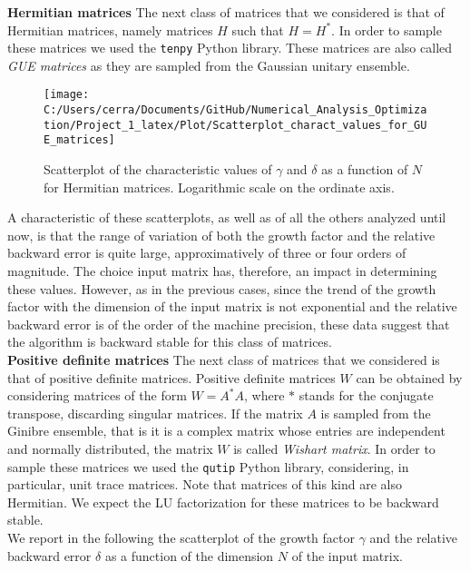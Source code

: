 \documentclass[a4paper,11pt]{article}
\begin{document}
\noindent \textbf{Hermitian matrices }  The next class of matrices that we considered is that of Hermitian matrices, namely matrices $H$ such that $H = H^{*}$. In order to sample these matrices we used the \texttt{tenpy} Python library. These matrices are also called \textit{GUE matrices} as they are sampled from the Gaussian unitary ensemble.

\begin{figure}[H]
	\centering
	\texttt{[image: C:/Users/cerra/Documents/GitHub/Numerical\_Analysis\_Optimization/Project\_1\_latex/Plot/Scatterplot\_charact\_values\_for\_GUE\_matrices]}
	\caption{Scatterplot of the characteristic values of $\gamma$ and $\delta$ as a function of $N$ for Hermitian matrices. Logarithmic scale on the ordinate axis.}
	\label{fig:Scatterplot_GUE}
\end{figure}

\noindent A characteristic of these scatterplots, as well as of all the others analyzed until now, is that the range of variation of both the growth factor and the relative backward error is quite large, approximatively of three or four orders of magnitude. The choice input matrix has, therefore, an impact in determining these values. However, as in the previous cases, since the trend of the growth factor with the dimension of the input matrix is not exponential and the relative backward error is of the order of the machine precision, these data suggest that the algorithm is backward stable for this class of matrices.\\

\noindent \textbf{Positive definite matrices } The next class of matrices that we considered is that of positive definite matrices. Positive definite matrices $W$ can be obtained by considering matrices of the form $W = A^{*}A$, where $*$ stands for the conjugate transpose, discarding singular matrices. If the matrix $A$ is sampled from the Ginibre ensemble, that is it is a complex matrix whose entries are independent and normally distributed, the matrix $W$ is called \textit{Wishart matrix}. In order to sample these matrices we used the \texttt{qutip} Python library, considering, in particular, unit trace matrices. Note that matrices of this kind are also Hermitian. We expect the LU factorization for these matrices to be backward stable.\\

\noindent We report in the following the scatterplot of the growth factor $\gamma$ and the relative backward error $\delta$ as a function of the dimension $N$ of the input matrix.
\end{document}
